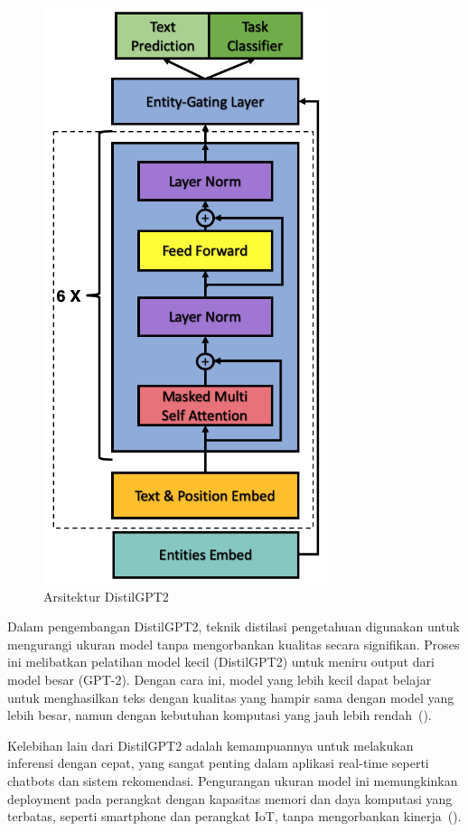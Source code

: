 \begin{figure}[H]
  \centering
  \includegraphics[scale=0.65]{gambar/DistilledGPT2Architecture.png}
  \caption{Arsitektur DistilGPT2}
  \label{fig:distilgpt2Architecture}
\end{figure}

Dalam pengembangan DistilGPT2, teknik distilasi pengetahuan digunakan untuk mengurangi ukuran model tanpa mengorbankan kualitas secara signifikan. Proses ini melibatkan pelatihan model kecil (DistilGPT2) untuk meniru output dari model besar (GPT-2). Dengan cara ini, model yang lebih kecil dapat belajar untuk menghasilkan teks dengan kualitas yang hampir sama dengan model yang lebih besar, namun dengan kebutuhan komputasi yang jauh lebih rendah~(\cite{sanh2019}).

Kelebihan lain dari DistilGPT2 adalah kemampuannya untuk melakukan inferensi dengan cepat, yang sangat penting dalam aplikasi real-time seperti chatbots dan sistem rekomendasi. Pengurangan ukuran model ini memungkinkan deployment pada perangkat dengan kapasitas memori dan daya komputasi yang terbatas, seperti smartphone dan perangkat IoT, tanpa mengorbankan kinerja~(\cite{merity2018}).

